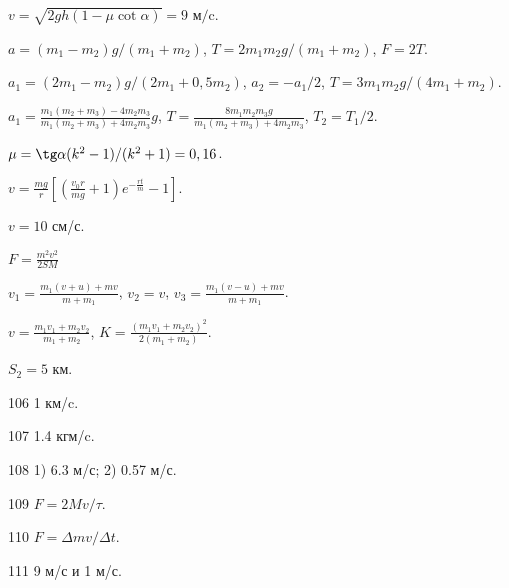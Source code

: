 \begin{Answer}{88}
$ v = \sqrt{2gh(1 - \mu \cot \alpha)} = 9 \textrm{ м/c}.$
\end{Answer}
\begin{Answer}{89}
$a = (m_1 - m_2)g / (m_1 + m_2)$, $T = 2 m_1 m_2 g /(m_1 + m_2)$, $F = 2T$.
\end{Answer}
\begin{Answer}{90}
$a_1 = (2m_1-m_2)g/(2m_1+0,5m_2)$, $a_2 = -a_1/2$, $T=3m_1 m_2g/(4m_1 + m_2)$.
\end{Answer}
\begin{Answer}{92}
$a_1 = \frac{m_1(m_2+m_3)-4m_2m_3}{m_1(m_2+m_3)+4m_2m_3}g$, $T= \frac{8m_1m_2m_3g}{m_1(m_2+m_3)+4m_2m_3}$, $T_2 = T_1/2$.
\end{Answer}
\begin{Answer}{93}
$\mu = \tg \alpha (k^2-1)/(k^2+1) = 0,16$.
\end{Answer}
\begin{Answer}{94}
$v = \frac{mg}{r}\left[ \left( \frac{v_0r}{mg} +1 \right)e^{-\frac{rt}{m}} - 1 \right]$.
\end{Answer}
\begin{Answer}{95}
$v=10$ см/с.
\end{Answer}
\begin{Answer}{96}
$F = \frac{m^2 v^2}{2SM}$
\end{Answer}
\begin{Answer}{97}
$v_1 = \frac{m_1(v+u)+mv}{m+m_1}$, $v_2 = v$, $v_3 = \frac{m_1(v-u)+mv}{m+m_1}$.
\end{Answer}
\begin{Answer}{98}
$v = \frac{m_1v_1 + m_2v_2}{m_1+m_2}$, $K = \frac{(m_1v_1+m_2v_2)^2}{2(m_1+m_2)}$.
\end{Answer}
\begin{Answer}{99}
$S_2 = 5$ км.
\end{Answer}
\begin{Answer}{106}
1 км/c.
\end{Answer}
\begin{Answer}{107}
1.4 кгм/c.
\end{Answer}
\begin{Answer}{108}
1) 6.3 м/с; 2) 0.57 м/с.
\end{Answer}
\begin{Answer}{109}
$F = 2Mv/\tau$.
\end{Answer}
\begin{Answer}{110}
$F = \Delta m v/ \Delta t$.
\end{Answer}
\begin{Answer}{111}
9 м/с и 1 м/с.
\end{Answer}
